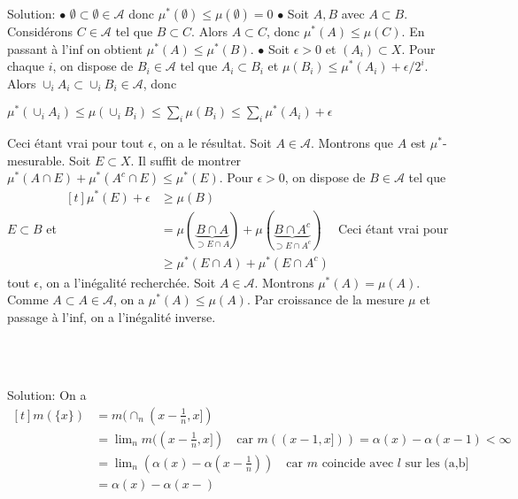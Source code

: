 \documentclass{report}
\begin{document}
Solution: $\bullet$ $\emptyset \subset \emptyset\in \mathcal A$ donc $\mu^*(\emptyset)\leq \mu(\emptyset) = 0$ \newline
$\bullet$ Soit $A,B$ avec $A\subset B$. Considérons $C\in \mathcal A$ tel que $B\subset C$. Alors $A\subset C$, donc $\mu^*(A)\leq \mu(C)$. En passant à l'inf on obtient $\mu^*(A)\leq \mu^*(B)$. \newline
$\bullet$ Soit $\epsilon>0$ et $(A_i)\subset X$. Pour chaque $i$, on dispose de $B_i \in\mathcal A$ tel que $A_i \subset B_i$ et $\mu(B_i) \leq \mu^*(A_i) + \epsilon /2^{i}$. Alors $\cup_i A_i \subset \cup_i B_i \in \mathcal A$, donc \newline \centerline{$\mu^*(\cup_i A_i) \leq \mu(\cup_i B_i) \leq \sum_i \mu(B_i) \leq \sum_i \mu^*(A_i) + \epsilon $}\newline
Ceci étant vrai pour tout $\epsilon$, on a le résultat. \newline \newline
Soit $A\in \mathcal A$. Montrons que $A$ est $\mu^*$-mesurable. Soit $E\subset X$. Il suffit de montrer $\mu^*(A\cap E) + \mu^*(A^c \cap E) \leq \mu^*(E)$.\newline
Pour $\epsilon>0$, on dispose de $B\in \mathcal A$ tel que $E\subset B$ et $\begin{aligned}[t] \mu^*(E)+\epsilon &\geq \mu(B) \\ &= \mu(\underbrace{B\cap A}_{\supset E\cap A}) + \mu(\underbrace{B\cap A^c}_{\supset E\cap A^c})\\ &\geq \mu^*(E\cap A) + \mu^*(E \cap A^c) \end{aligned}$
Ceci étant vrai pour tout $\epsilon$, on a l'inégalité recherchée. \newline \newline
Soit $A\in \mathcal A$. Montrons $\mu^*(A) = \mu(A)$. Comme $A\subset A \in\mathcal A$, on a $\mu^*(A)\leq \mu(A)$.
Par croissance de la mesure $\mu$ et passage à l'inf, on a l'inégalité inverse. \\

 \subsection{}  \\ \\
Solution: On a $\begin{aligned}[t] m(\{x\}) &= m(\cap_n (x-\frac 1n , x])\\
&= \lim_n m((x-\frac 1n , x]) \quad \text{car } m((x-1,x]))=\alpha(x)-\alpha(x-1) <\infty \\ &= \lim_n \left(\alpha(x) - \alpha(x-\frac 1n)\right) \quad \text{car $m$ coincide avec $l$ sur les (a,b]} \\ &= \alpha(x) - \alpha(x-)  \end{aligned}$
\end{document}
